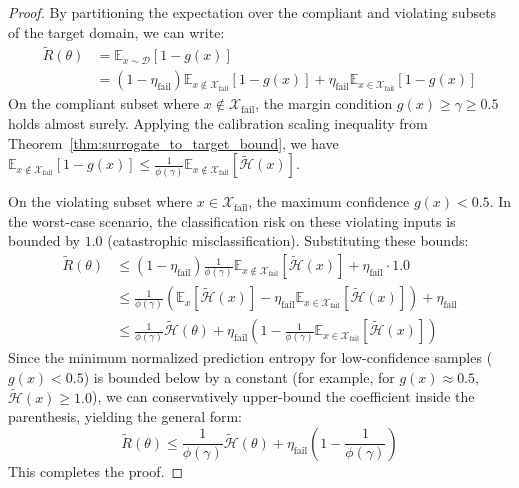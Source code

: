 \documentclass{article}
\theoremstyle{plain}
\theoremstyle{definition}
\theoremstyle{remark}
\begin{document}
\begin{proof}
By partitioning the expectation over the compliant and violating subsets of the target domain, we can write:
\begin{equation*}
\begin{aligned}
\tilde{R}(\theta) &= \mathbb{E}_{x \sim \mathcal{D}} [1 - g(x)] \\
&= (1 - \eta_{\text{fail}}) \mathbb{E}_{x \notin \mathcal{X}_{\text{fail}}} [1 - g(x)] + \eta_{\text{fail}} \mathbb{E}_{x \in \mathcal{X}_{\text{fail}}} [1 - g(x)]
\end{aligned}
\end{equation*}
On the compliant subset where $x \notin \mathcal{X}_{\text{fail}}$, the margin condition $g(x) \ge \gamma \ge 0.5$ holds almost surely. Applying the calibration scaling inequality from Theorem~\ref{thm:surrogate_to_target_bound}, we have $\mathbb{E}_{x \notin \mathcal{X}_{\text{fail}}} [1 - g(x)] \le \frac{1}{\phi(\gamma)} \mathbb{E}_{x \notin \mathcal{X}_{\text{fail}}} [\tilde{\mathcal{H}}(x)]$.

On the violating subset where $x \in \mathcal{X}_{\text{fail}}$, the maximum confidence $g(x) < 0.5$. In the worst-case scenario, the classification risk on these violating inputs is bounded by $1.0$ (catastrophic misclassification). Substituting these bounds:
\begin{equation*}
\begin{aligned}
\tilde{R}(\theta) &\le (1 - \eta_{\text{fail}}) \frac{1}{\phi(\gamma)} \mathbb{E}_{x \notin \mathcal{X}_{\text{fail}}} [\tilde{\mathcal{H}}(x)] + \eta_{\text{fail}} \cdot 1.0 \\
&\le \frac{1}{\phi(\gamma)} \left( \mathbb{E}_{x} [\tilde{\mathcal{H}}(x)] - \eta_{\text{fail}} \mathbb{E}_{x \in \mathcal{X}_{\text{fail}}} [\tilde{\mathcal{H}}(x)] \right) + \eta_{\text{fail}} \\
&\le \frac{1}{\phi(\gamma)} \tilde{\mathcal{H}}(\theta) + \eta_{\text{fail}} \left( 1 - \frac{1}{\phi(\gamma)} \mathbb{E}_{x \in \mathcal{X}_{\text{fail}}} [\tilde{\mathcal{H}}(x)] \right)
\end{aligned}
\end{equation*}
Since the minimum normalized prediction entropy for low-confidence samples ($g(x) < 0.5$) is bounded below by a constant (for example, for $g(x) \approx 0.5$, $\tilde{\mathcal{H}}(x) \ge 1.0$), we can conservatively upper-bound the coefficient inside the parenthesis, yielding the general form:
\begin{equation*}
\tilde{R}(\theta) \le \frac{1}{\phi(\gamma)} \tilde{\mathcal{H}}(\theta) + \eta_{\text{fail}} \left( 1 - \frac{1}{\phi(\gamma)} \right)
\end{equation*}
This completes the proof.
\end{proof}
\end{document}
